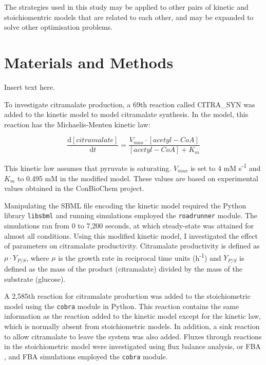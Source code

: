 \documentclass[a4paper, 12pt]{scrartcl}
\begin{document}
{%
The strategies used in this study may be applied to other pairs of kinetic and stoichiomentric models that are related to each other, and may be expanded to solve other optimisation problems.

  
\section*{Materials and Methods}
\label{sec:methods}

Insert text here.

To investigate citramalate production, a 69th reaction called CITRA\_SYN was added to the kinetic model to model citramalate synthesis.  In the model, this reaction has the Michaelis-Menten kinetic law:

\begin{equation}
  \frac{\mathrm{d}[citramalate]}{\mathrm{d}t} = 
  \frac{V_{max} \cdot [acetyl-CoA]}{[acetyl-CoA] + K_{m}}
\end{equation}
\label{eq:michaelismenten}

This kinetic law assumes that pyruvate is saturating. $V_{max}$ is set to 4 mM s\textsuperscript{-1} and $K_{m}$ to 0.495 mM in the modified model. These values are based on experimental values obtained in the ConBioChem project.

Manipulating the SBML file encoding the kinetic model required the Python library \texttt{libsbml} \citep{bornstein_libsbml:_2008} and running simulations employed the \texttt{roadrunner} \citep{somogyi_libroadrunner:_2015} module. The simulations ran from 0 to 7,200 seconds, at which steady-state was attained for almost all conditions.
Using this modified kinetic model, I investigated the effect of parameters on citramalate productivity. Citramalate productivity is defined as $\mu \cdot Y_{P/S}$, where $\mu$ is the growth rate in reciprocal time units (h\textsuperscript{-1}) and $Y_{P/S}$ is defined as the mass of the product (citramalate) divided by the mass of the substrate (glucose).

A 2,585th reaction for citramalate production was added to the stoichiometric model using the \texttt{cobra} module \citep{ebrahim_cobrapy:_2013} in Python. This reaction contains the same information as the reaction added to the kinetic model except for the kinetic law, which is normally absent from stoichiometric models. In addition, a sink reaction to allow citramalate to leave the system was also added.
Fluxes through reactions in the stoichiometric model were investigated using flux balance analysis, or FBA \citep{orth_what_2010}, and FBA simulations employed the \texttt{cobra} module.

}
\end{document}
